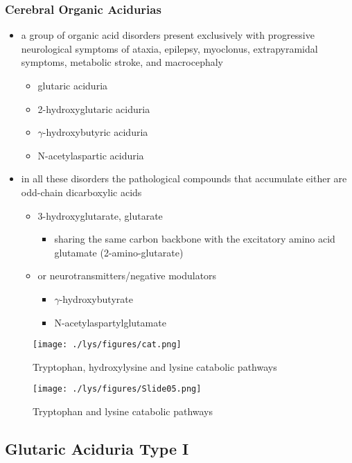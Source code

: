 \documentclass{scrartcl}
\begin{document}
\subsubsection{Cerebral Organic Acidurias}
\label{sec:org276143e}
\begin{itemize}
\item a group of organic acid disorders present exclusively with
progressive neurological symptoms of ataxia, epilepsy, myoclonus,
extrapyramidal symptoms, metabolic stroke, and macrocephaly
\begin{itemize}
\item glutaric aciduria
\item 2-hydroxyglutaric aciduria
\item \(\gamma\)-hydroxybutyric aciduria
\item N-acetylaspartic aciduria
\end{itemize}
\item in all these disorders the pathological compounds that accumulate
either are odd-chain dicarboxylic acids
\begin{itemize}
\item 3-hydroxyglutarate, glutarate
\begin{itemize}
\item sharing the same carbon backbone with the excitatory amino acid
glutamate (2-amino-glutarate)
\end{itemize}
\item or neurotransmitters/negative modulators
\begin{itemize}
\item \(\gamma\)-hydroxybutyrate
\item N-acetylaspartylglutamate
\end{itemize}
\end{itemize}
\end{itemize}

\begin{figure}[htbp]
\centering
\texttt{[image: ./lys/figures/cat.png]}
\caption{\label{fig:orgcdf1f90}
Tryptophan, hydroxylysine and lysine catabolic pathways}
\end{figure}


\begin{figure}[htbp]
\centering
\texttt{[image: ./lys/figures/Slide05.png]}
\caption{\label{fig:org01625dd}
Tryptophan and lysine catabolic pathways}
\end{figure}

\subsection{Glutaric Aciduria Type I}
\label{sec:orgec026c1}
\end{document}
